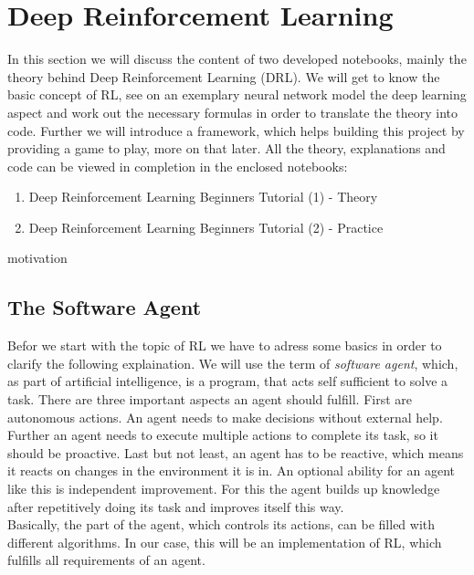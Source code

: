 \section{Deep Reinforcement Learning}
	In this section we will discuss the content of two developed notebooks, mainly the theory behind Deep Reinforcement Learning (DRL). We will get to know the basic concept of RL, see on an exemplary neural network model the deep learning aspect and work out the necessary formulas in order to translate the theory into code. Further we will introduce a framework, which helps building this project by providing a game to play, more on that later.  All the theory, explanations and code can be viewed in completion in the enclosed notebooks:
	\begin{enumerate}
		\item Deep Reinforcement Learning Beginners Tutorial (1) - Theory 
		\item Deep Reinforcement Learning Beginners Tutorial (2) - Practice
	\end{enumerate}
	
motivation	

\subsection{The Software Agent}
	Befor we start with the topic of RL we have to adress some basics in order to clarify the following explaination. We will use the term of \textit{software agent}, which, as part of artificial intelligence, is a program, that acts self sufficient to solve a task. There are three important aspects an agent should fulfill. First are autonomous actions. An agent needs to make decisions without external help. Further an agent needs to execute multiple actions to complete its task, so it should be proactive. Last but not least, an agent has to be reactive, which means it reacts on changes in the environment it is in. An optional ability for an agent like this is independent improvement. For this the agent builds up knowledge after repetitively doing its task and improves itself this way.\\
	Basically, the part of the agent, which controls its actions, can be filled with different algorithms. In our case, this will be an implementation of RL, which fulfills all requirements of an agent.

